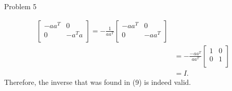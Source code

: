 \begin{problem}{Problem 5}
\begin{highlight}
\begin{align}
\begin{bmatrix}
                -aa^{T} & 0 \\
                0 & -a^{T}a \\
            \end{bmatrix}
            = -\frac{1}{aa^{T}}
            \begin{bmatrix}
                -aa^{T} & 0 \\
                0 & -aa^{T} \\
            \end{bmatrix} \\
            & = -\frac{-aa^{T}}{aa^{T}}
            \begin{bmatrix}
                1 & 0 \\
                0 & 1 \\
            \end{bmatrix} \\
            & = I.
        \end{align}
        Therefore, the inverse that was found in (9) is indeed valid.
    \end{highlight}
\end{problem}


